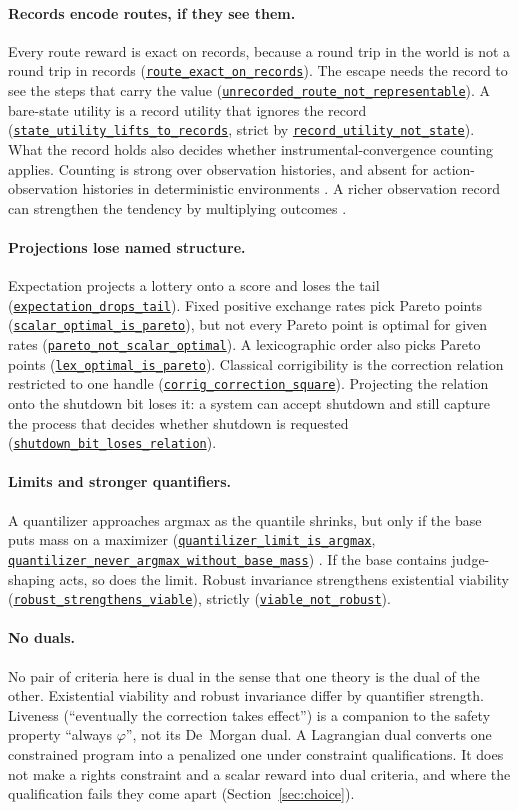\documentclass[11pt]{article}
\newcommand{\lean}[1]{\hyperref[lean:#1]{\nolinkurl{#1}}}
\begin{document}
\paragraph{Records encode routes, if they see them.}
Every route reward is exact on records, because a round trip in the world is not a round trip in records (\lean{route_exact_on_records}).
The escape needs the record to see the steps that carry the value (\lean{unrecorded_route_not_representable}).
A bare-state utility is a record utility that ignores the record (\lean{state_utility_lifts_to_records}, strict by \lean{record_utility_not_state}).
What the record holds also decides whether instrumental-convergence counting applies.
Counting is strong over observation histories, and absent for action-observation histories in deterministic environments \parencite{turner2021aoh}.
A richer observation record can strengthen the tendency by multiplying outcomes \parencite[Section~4.2]{turner2022retargetable}.

\paragraph{Projections lose named structure.}
Expectation projects a lottery onto a score and loses the tail (\lean{expectation_drops_tail}).
Fixed positive exchange rates pick Pareto points (\lean{scalar_optimal_is_pareto}), but not every Pareto point is optimal for given rates (\lean{pareto_not_scalar_optimal}).
A lexicographic order also picks Pareto points (\lean{lex_optimal_is_pareto}).
Classical corrigibility is the correction relation restricted to one handle (\lean{corrig_correction_square}).
Projecting the relation onto the shutdown bit loses it: a system can accept shutdown and still capture the process that decides whether shutdown is requested (\lean{shutdown_bit_loses_relation}).

\paragraph{Limits and stronger quantifiers.}
A quantilizer approaches argmax as the quantile shrinks, but only if the base puts mass on a maximizer (\lean{quantilizer_limit_is_argmax}, \lean{quantilizer_never_argmax_without_base_mass}) \parencite{taylor2015quantilizers}.
If the base contains judge-shaping acts, so does the limit.
Robust invariance strengthens existential viability (\lean{robust_strengthens_viable}), strictly (\lean{viable_not_robust}).

\paragraph{No duals.}
No pair of criteria here is dual in the sense that one theory is the dual of the other.
Existential viability and robust invariance differ by quantifier strength.
Liveness (``eventually the correction takes effect'') is a companion to the safety property ``always $\varphi$'', not its De~Morgan dual.
A Lagrangian dual converts one constrained program into a penalized one under constraint qualifications.
It does not make a rights constraint and a scalar reward into dual criteria, and where the qualification fails they come apart (Section~\ref{sec:choice}).
\end{document}
